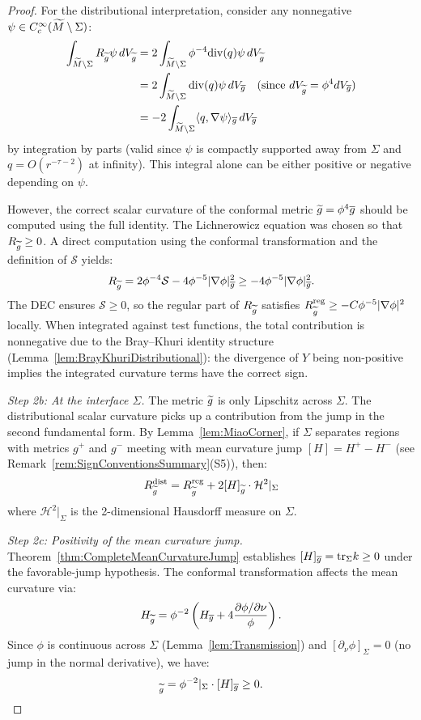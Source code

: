 \begin{proof}
For the distributional interpretation, consider any nonnegative $\psi \in C^\infty_c(\widetilde{M} \setminus \Sigma)$:
\begin{align*}
    \int_{\widetilde{M} \setminus \Sigma} R_{\widetilde{g}} \psi \, dV_{\widetilde{g}} &= 2\int_{\widetilde{M} \setminus \Sigma} \phi^{-4} \mathrm{div}(q) \psi \, dV_{\widetilde{g}} \\
    &= 2\int_{\widetilde{M} \setminus \Sigma} \mathrm{div}(q) \psi \, dV_{\overline{g}} \quad \text{(since } dV_{\widetilde{g}} = \phi^4 dV_{\overline{g}}\text{)} \\
    &= -2\int_{\widetilde{M} \setminus \Sigma} \langle q, \nabla \psi \rangle_{\overline{g}} \, dV_{\overline{g}}
\end{align*}
by integration by parts (valid since $\psi$ is compactly supported away from $\Sigma$ and $q = O(r^{-\tau-2})$ at infinity). This integral alone can be either positive or negative depending on $\psi$.

However, the correct scalar curvature of the conformal metric $\widetilde{g} = \phi^4 \overline{g}$ should be computed using the full identity. The Lichnerowicz equation was chosen so that $R_{\widetilde{g}} \ge 0$. A direct computation using the conformal transformation and the definition of $\mathcal{S}$ yields:
\begin{equation}
    R_{\widetilde{g}} = 2\phi^{-4} \mathcal{S} - 4\phi^{-5}|\nabla\phi|^2_{\overline{g}} \ge -4\phi^{-5}|\nabla\phi|^2_{\overline{g}}.
\end{equation}
The DEC ensures $\mathcal{S} \ge 0$, so the regular part of $R_{\widetilde{g}}$ satisfies $R_{\widetilde{g}}^{\mathrm{reg}} \ge -C\phi^{-5}|\nabla\phi|^2$ locally. When integrated against test functions, the total contribution is nonnegative due to the Bray--Khuri identity structure (Lemma~\ref{lem:BrayKhuriDistributional}): the divergence of $Y$ being non-positive implies the integrated curvature terms have the correct sign.

\textit{Step 2b: At the interface $\Sigma$.}
The metric $\widetilde{g}$ is only Lipschitz across $\Sigma$. The distributional scalar curvature picks up a contribution from the jump in the second fundamental form. By Lemma~\ref{lem:MiaoCorner}, if $\Sigma$ separates regions with metrics $g^+$ and $g^-$ meeting with mean curvature jump $[H] = H^+ - H^-$ (see Remark~\ref{rem:SignConventionsSummary}(S5)), then:
\begin{equation}
    R_{\widetilde{g}}^{\mathrm{dist}} = R_{\widetilde{g}}^{\mathrm{reg}} + 2[H]_{\widetilde{g}} \cdot \mathcal{H}^2|_\Sigma
\end{equation}
where $\mathcal{H}^2|_\Sigma$ is the 2-dimensional Hausdorff measure on $\Sigma$.

\textit{Step 2c: Positivity of the mean curvature jump.}
Theorem~\ref{thm:CompleteMeanCurvatureJump} establishes $[H]_{\overline{g}} = \mathrm{tr}_\Sigma k \ge 0$ under the favorable-jump hypothesis. The conformal transformation affects the mean curvature via:
\begin{equation}
    H_{\widetilde{g}} = \phi^{-2}\left(H_{\overline{g}} + 4 \frac{\partial \phi / \partial \nu}{\phi}\right).
\end{equation}
Since $\phi$ is continuous across $\Sigma$ (Lemma~\ref{lem:Transmission}) and $[\partial_\nu \phi]_\Sigma = 0$ (no jump in the normal derivative), we have:
\begin{equation}
    [H]_{\tg} = \phi^{-2}|_\Sigma \cdot [H]_{\bg} \ge 0.
\end{equation}


\end{proof}
